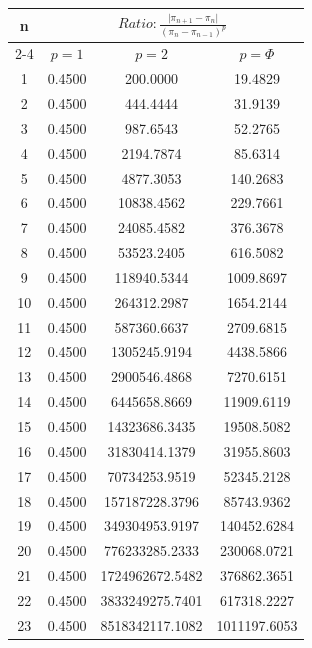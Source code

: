 \documentclass{article}
\providecommand{\abs}[1]{\lvert#1\rvert}
\begin{document}
\begin{tabular}{|c|c|c|c|}
\hline
\multirow{2}{*}{n} & \multicolumn{3}{|c|}{$Ratio:\displaystyle\frac{\abs{\pi_{n+1}-\pi_{n}}}{({\pi_{n}-\pi_{n-1}})^p}$} \\
\cline{2-4}
 & $p=1$ & $p=2$ & $p=\Phi$ \\
\hline
 1 & 0.4500 & 200.0000 & 19.4829 \\ 
  2 & 0.4500 & 444.4444 & 31.9139 \\ 
  3 & 0.4500 & 987.6543 & 52.2765 \\ 
  4 & 0.4500 & 2194.7874 & 85.6314 \\ 
  5 & 0.4500 & 4877.3053 & 140.2683 \\ 
  6 & 0.4500 & 10838.4562 & 229.7661 \\ 
  7 & 0.4500 & 24085.4582 & 376.3678 \\ 
  8 & 0.4500 & 53523.2405 & 616.5082 \\ 
  9 & 0.4500 & 118940.5344 & 1009.8697 \\ 
 10 & 0.4500 & 264312.2987 & 1654.2144 \\ 
 11 & 0.4500 & 587360.6637 & 2709.6815 \\ 
 12 & 0.4500 & 1305245.9194 & 4438.5866 \\ 
 13 & 0.4500 & 2900546.4868 & 7270.6151 \\ 
 14 & 0.4500 & 6445658.8669 & 11909.6119 \\ 
 15 & 0.4500 & 14323686.3435 & 19508.5082 \\ 
 16 & 0.4500 & 31830414.1379 & 31955.8603 \\ 
 17 & 0.4500 & 70734253.9519 & 52345.2128 \\ 
 18 & 0.4500 & 157187228.3796 & 85743.9362 \\ 
 19 & 0.4500 & 349304953.9197 & 140452.6284 \\ 
 20 & 0.4500 & 776233285.2333 & 230068.0721 \\ 
 21 & 0.4500 & 1724962672.5482 & 376862.3651 \\ 
 22 & 0.4500 & 3833249275.7401 & 617318.2227 \\ 
 23 & 0.4500 & 8518342117.1082 & 1011197.6053 \\ 
 \hline 
\end{tabular}
\end{document}

